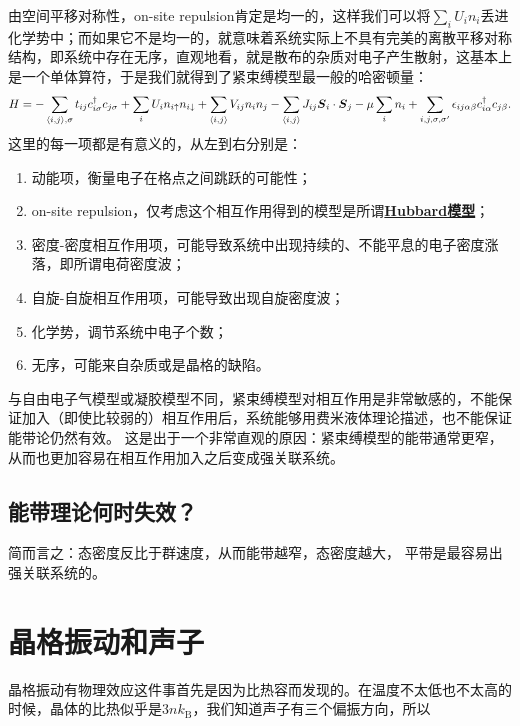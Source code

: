 \documentclass[hyperref, UTF8, a4paper]{ctexart}
\newcommand*{\pair}[1]{\langle #1 \rangle}
\newcommand*{\concept}[1]{\underline{\textbf{#1}}}
\begin{document}
由空间平移对称性，on-site repulsion肯定是均一的，这样我们可以将$\sum_i U_i n_i$丢进化学势中；而如果它不是均一的，就意味着系统实际上不具有完美的离散平移对称结构，即系统中存在无序，直观地看，就是散布的杂质对电子产生散射，这基本上是一个单体算符，于是我们就得到了紧束缚模型最一般的哈密顿量：
\begin{equation}
    H = - \sum_{\pair{i, j}, \sigma} t_{ij} c^\dagger_{i \sigma} c_{j \sigma} 
    + \sum_{i} U_i n_{i \uparrow} n_{i \downarrow} 
    + \sum_{\pair{i, j}} V_{ij} n_i n_j - \sum_{\pair{i, j}} J_{i j} \vb*{S}_{i} \cdot \vb*{S}_j 
    - \mu \sum_i n_i + \sum_{i, j, \sigma, \sigma'} \epsilon_{ij\alpha \beta} c^\dagger_{i \alpha} c_{j \beta}.  
\end{equation}
这里的每一项都是有意义的，从左到右分别是：
\begin{enumerate}
    \item 动能项，衡量电子在格点之间跳跃的可能性；
    \item on-site repulsion，仅考虑这个相互作用得到的模型是所谓\concept{Hubbard模型}；
    \item 密度-密度相互作用项，可能导致系统中出现持续的、不能平息的电子密度涨落，即所谓电荷密度波；
    \item 自旋-自旋相互作用项，可能导致出现自旋密度波；
    \item 化学势，调节系统中电子个数；
    \item 无序，可能来自杂质或是晶格的缺陷。
\end{enumerate}

与自由电子气模型或凝胶模型不同，紧束缚模型对相互作用是非常敏感的，不能保证加入（即使比较弱的）相互作用后，系统能够用费米液体理论描述，也不能保证能带论仍然有效。
这是出于一个非常直观的原因：紧束缚模型的能带通常更窄，从而也更加容易在相互作用加入之后变成强关联系统。

\subsection{能带理论何时失效？}

简而言之：态密度反比于群速度，从而能带越窄，态密度越大，
平带是最容易出强关联系统的。

\section{晶格振动和声子}

晶格振动有物理效应这件事首先是因为比热容而发现的。在温度不太低也不太高的时候，晶体的比热似乎是$3 n k_\text{B}$，我们知道声子有三个偏振方向，所以
\end{document}
